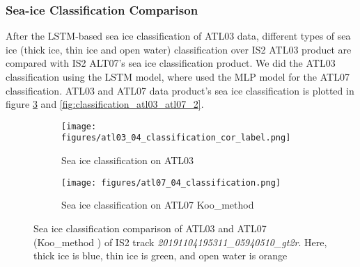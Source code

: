 \subsubsection{Sea-ice Classification Comparison}
After the LSTM-based sea ice classification of ATL03 data, different types of sea ice (thick ice, thin ice and open water) classification over IS2 ATL03 product are compared with IS2 ALT07's sea ice classification product. We did the ATL03 classification using the LSTM model, where \cite{koo2023sea} used the MLP model for the ATL07 classification. ATL03 and ATL07 data product's sea ice classification is plotted in figure \ref{fig:classification_atl03_atl07_1} and \ref{fig:classification_atl03_atl07_2}. 
%
\begin{figure}[ht]
        \centering
        \begin{subfigure}[b]{\linewidth}
            \centering
            \texttt{[image: figures/atl03\_04\_classification\_cor\_label.png]}
            \caption{Sea ice classification on ATL03}%
            \label{fig:elev04_atl03}
        \end{subfigure}

        \begin{subfigure}[b]{\linewidth}
            \centering
            \texttt{[image: figures/atl07\_04\_classification.png]}
            \caption{Sea ice classification on ATL07 Koo\_method \cite{koo2023sea}}%
            \label{fig:elev_atl07_1}
        \end{subfigure}
    \caption{Sea ice classification comparison of ATL03 and ATL07 (Koo\_method \cite{koo2023sea}) of IS2 track \textit{20191104195311\_05940510\_gt2r}. Here, thick ice is blue, thin ice is green, and open water is orange}
    \label{fig:classification_atl03_atl07_1}
\end{figure}
%
